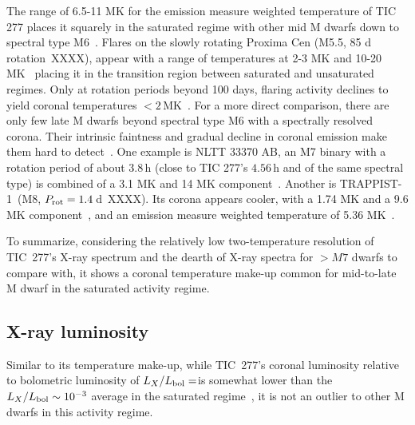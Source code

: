 \documentclass[twocolumn]{aastex631}
\begin{document}
The range of 6.5-11 MK for the emission measure weighted temperature of TIC 277 places it squarely in the saturated regime with other mid M dwarfs down to spectral type M6~\citep{wright2018stellar, magaudda2020relation, stelzer2022first,robrade2005xray,raassen2003xray,paudel2021simultaneous, foster2020corona}. Flares on the slowly rotating Proxima Cen (M5.5, 85 d rotation~XXXX), appear with a range of temperatures at 2-3 MK and 10-20 MK~\citep{gudel2004flares, fuhrmeister2011multiwavelength, fuhrmeister2022high, howard2022mouse} placing it in the transition region between saturated and unsaturated regimes. Only at rotation periods beyond 100 days, flaring activity declines to yield coronal temperatures $<2\,$MK~\citep{wright2018stellar, foster2020corona}. For a more direct comparison, there are only few late M dwarfs beyond spectral type M6 with a spectrally resolved corona. Their intrinsic faintness and gradual decline in coronal emission make them hard to detect~\citep{berger2010, cook2014trends, stelzer2022first}. One example is NLTT 33370 AB, an M7 binary with a rotation period of about $3.8\,$h (close to TIC 277's $4.56\,$h and of the same spectral type) is combined of a 3.1 MK and 14 MK component~\citep{williams2015simultaneous}. Another is TRAPPIST-1~(M8, $P_{\rm rot} = 1.4\,$d~XXXX). Its corona appears cooler, with a 1.74 MK and a 9.6 MK component~\citep{wheatley2017strong}, and an emission measure weighted temperature of 5.36 MK~\citep{brown2023coronal}. 

To summarize, considering the relatively low two-temperature resolution of TIC~277's X-ray spectrum and the dearth of X-ray spectra for $>M7$ dwarfs to compare with, it shows a coronal temperature make-up common for mid-to-late M dwarf in the saturated activity regime. 






\subsection{X-ray luminosity}
\label{sec:discussion:xraylum}
Similar to its temperature make-up, while TIC~277's coronal luminosity relative to bolometric luminosity of $L_X/L_{\rm bol}=$\LXLbol is somewhat lower than the $L_X/L_{\rm bol}\sim 10^{-3}$ average in the saturated regime~\citep{wright2011stellaractivityrotation,wright2018stellar}, it is not an outlier to other M dwarfs in this activity regime.  
\end{document}
